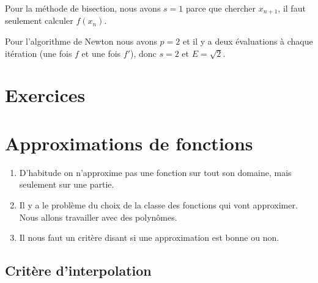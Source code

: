 \begin{example}[Bisection]
    Pour la méthode de bisection, nous avons \( s=1\) parce que chercher \( x_{n+1}\), il faut seulement calculer \( f(x_n)\).
\end{example}

\begin{example}[Newton]
    Pour l'algorithme de Newton nous avons \( p=2\) et il y a deux évaluations à chaque itération (une fois \( f\) et une fois \( f'\)), donc \( s=2\) et \( E=\sqrt{ 2 }\).
\end{example}

\section{Exercices}


\section{Approximations de fonctions}

\begin{enumerate}
    \item
        D'habitude on n'approxime pas une fonction sur tout son domaine, mais seulement sur une partie.
    \item
        Il y a le problème du choix de la classe des fonctions qui vont approximer. Nous allons travailler avec des polynômes.
    \item
        Il nous faut un critère disant si une approximation est bonne ou non.
\end{enumerate}

\subsection{Critère d'interpolation}

